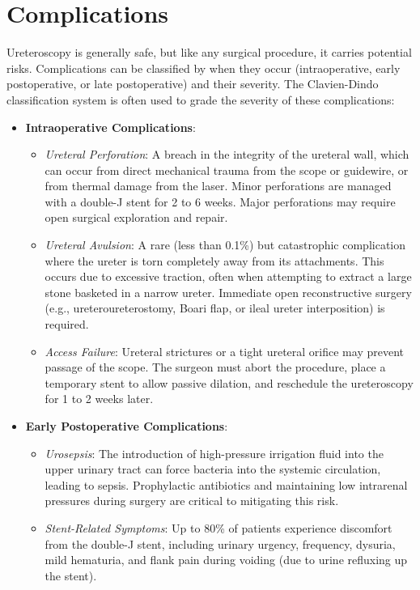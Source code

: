 \section*{Complications}
Ureteroscopy is generally safe, but like any surgical procedure, it carries potential risks. Complications can be classified by when they occur (intraoperative, early postoperative, or late postoperative) and their severity.
The Clavien-Dindo classification system is often used to grade the severity of these complications:
\begin{itemize}
\item \textbf{Intraoperative Complications}:
  \begin{itemize}
  \item \textit{Ureteral Perforation}: A breach in the integrity of the ureteral wall, which can occur from direct mechanical trauma from the scope or guidewire, or from thermal damage from the laser. Minor perforations are managed with a double-J stent for 2 to 6 weeks. Major perforations may require open surgical exploration and repair.
  \item \textit{Ureteral Avulsion}: A rare (less than 0.1\%) but catastrophic complication where the ureter is torn completely away from its attachments. This occurs due to excessive traction, often when attempting to extract a large stone basketed in a narrow ureter. Immediate open reconstructive surgery (e.g., ureteroureterostomy, Boari flap, or ileal ureter interposition) is required.
  \item \textit{Access Failure}: Ureteral strictures or a tight ureteral orifice may prevent passage of the scope. The surgeon must abort the procedure, place a temporary stent to allow passive dilation, and reschedule the ureteroscopy for 1 to 2 weeks later.
  \end{itemize}
\item \textbf{Early Postoperative Complications}:
  \begin{itemize}
  \item \textit{Urosepsis}: The introduction of high-pressure irrigation fluid into the upper urinary tract can force bacteria into the systemic circulation, leading to sepsis. Prophylactic antibiotics and maintaining low intrarenal pressures during surgery are critical to mitigating this risk.
  \item \textit{Stent-Related Symptoms}: Up to 80\% of patients experience discomfort from the double-J stent, including urinary urgency, frequency, dysuria, mild hematuria, and flank pain during voiding (due to urine refluxing up the stent).

\end{itemize}
\end{itemize}
